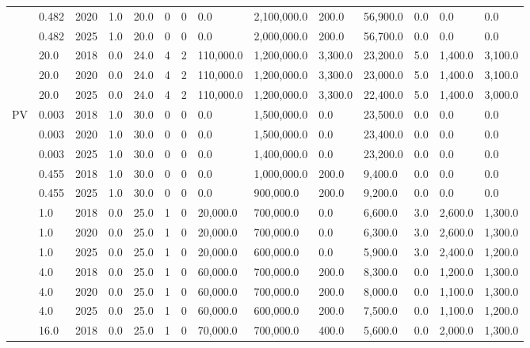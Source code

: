 \begin{table*}[]
\begin{tabularx}{\linewidth}{|p{}|l|c|l|l|l|l|l|l|l|l|l|l|l|}
& 0.482 & 2020 & 1.0 & 20.0 & 0 & 0 & 0.0 & 2,100,000.0 & 200.0 & 56,900.0 & 0.0 & 0.0 & 0.0 \\ \cline{2-14} 
& 0.482 & 2025 & 1.0 & 20.0 & 0 & 0 & 0.0 & 2,000,000.0 & 200.0 & 56,700.0 & 0.0 & 0.0 & 0.0 \\ \cline{2-14} 
& 20.0 & 2018 & 0.0 & 24.0 & 4 & 2 & 110,000.0 & 1,200,000.0 & 3,300.0 & 23,200.0 & 5.0 & 1,400.0 & 3,100.0 \\ \cline{2-14} 
& 20.0 & 2020 & 0.0 & 24.0 & 4 & 2 & 110,000.0 & 1,200,000.0 & 3,300.0 & 23,000.0 & 5.0 & 1,400.0 & 3,100.0 \\ \cline{2-14} 
& 20.0 & 2025 & 0.0 & 24.0 & 4 & 2 & 110,000.0 & 1,200,000.0 & 3,300.0 & 22,400.0 & 5.0 & 1,400.0 & 3,000.0 \\ \hline
\multirow{14}{*}{PV} & 0.003 & 2018 & 1.0 & 30.0 & 0 & 0 & 0.0 & 1,500,000.0 & 0.0 & 23,500.0 & 0.0 & 0.0 & 0.0 \\ \cline{2-14} 
& 0.003 & 2020 & 1.0 & 30.0 & 0 & 0 & 0.0 & 1,500,000.0 & 0.0 & 23,400.0 & 0.0 & 0.0 & 0.0 \\ \cline{2-14} 
& 0.003 & 2025 & 1.0 & 30.0 & 0 & 0 & 0.0 & 1,400,000.0 & 0.0 & 23,200.0 & 0.0 & 0.0 & 0.0 \\ \cline{2-14} 
& 0.455 & 2018 & 1.0 & 30.0 & 0 & 0 & 0.0 & 1,000,000.0 & 200.0 & 9,400.0 & 0.0 & 0.0 & 0.0 \\ \cline{2-14} 
& 0.455 & 2025 & 1.0 & 30.0 & 0 & 0 & 0.0 & 900,000.0 & 200.0 & 9,200.0 & 0.0 & 0.0 & 0.0 \\ \cline{2-14} 
& 1.0 & 2018 & 0.0 & 25.0 & 1 & 0 & 20,000.0 & 700,000.0 & 0.0 & 6,600.0 & 3.0 & 2,600.0 & 1,300.0 \\ \cline{2-14} 
& 1.0 & 2020 & 0.0 & 25.0 & 1 & 0 & 20,000.0 & 700,000.0 & 0.0 & 6,300.0 & 3.0 & 2,600.0 & 1,300.0 \\ \cline{2-14} 
& 1.0 & 2025 & 0.0 & 25.0 & 1 & 0 & 20,000.0 & 600,000.0 & 0.0 & 5,900.0 & 3.0 & 2,400.0 & 1,200.0 \\ \cline{2-14} 
& 4.0 & 2018 & 0.0 & 25.0 & 1 & 0 & 60,000.0 & 700,000.0 & 200.0 & 8,300.0 & 0.0 & 1,200.0 & 1,300.0 \\ \cline{2-14} 
& 4.0 & 2020 & 0.0 & 25.0 & 1 & 0 & 60,000.0 & 700,000.0 & 200.0 & 8,000.0 & 0.0 & 1,100.0 & 1,300.0 \\ \cline{2-14} 
& 4.0 & 2025 & 0.0 & 25.0 & 1 & 0 & 60,000.0 & 600,000.0 & 200.0 & 7,500.0 & 0.0 & 1,100.0 & 1,200.0 \\ \cline{2-14} 
& 16.0 & 2018 & 0.0 & 25.0 & 1 & 0 & 70,000.0 & 700,000.0 & 400.0 & 5,600.0 & 0.0 & 2,000.0 & 1,300.0 \\ \cline{2-14} 

\end{tabularx}
\end{table*}
